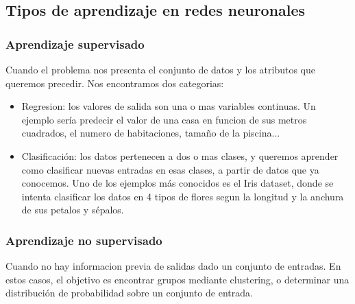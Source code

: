 \subsection{Tipos de aprendizaje en redes neuronales}
\subsubsection {Aprendizaje supervisado}
Cuando el problema nos presenta el conjunto de datos y los atributos que queremos precedir. Nos encontramos dos categorias:
\begin{itemize}
\item Regresion: los valores de salida son una o mas variables continuas. Un ejemplo sería predecir el valor de una casa en funcion de sus metros cuadrados, el numero de habitaciones, tamaño de la piscina...
\item Clasificación: los datos pertenecen a dos o mas clases, y queremos aprender como clasificar nuevas entradas en esas clases, a partir de datos que ya conocemos. Uno de los ejemplos más conocidos es el Iris dataset, donde se intenta clasificar los datos en 4 tipos de flores segun la longitud y la anchura de sus petalos y sépalos.
\end{itemize}
\subsubsection {Aprendizaje no supervisado}
Cuando no hay informacion previa de salidas dado un conjunto de entradas. En estos casos, el objetivo es encontrar grupos mediante clustering, o determinar una distribución de probabilidad sobre un conjunto de entrada.



